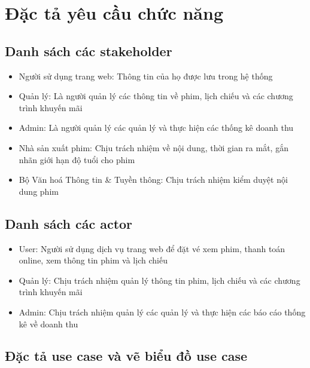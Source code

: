 \documentclass[a4paper, 12pt]{article}
\begin{document}
    \section{Đặc tả yêu cầu chức năng}
    \label{sec:describeFunction}

    \subsection{Danh sách các stakeholder}
    \begin{itemize}
        \item Người sử dụng trang web: Thông tin của họ được lưu trong hệ thống
        \item Quản lý: Là người quản lý các thông tin về phim, lịch chiếu và các chương trình khuyến mãi
        \item Admin: Là người quản lý các quản lý và thực hiện các thống kê doanh thu 
        \item Nhà sản xuất phim: Chịu trách nhiệm về nội dung, thời gian ra mắt, gắn nhãn giới hạn độ tuổi cho phim
        \item Bộ Văn hoá Thông tin \& Tuyền thông: Chịu trách nhiệm kiểm duyệt nội dung phim
    \end{itemize}

    \subsection{Danh sách các actor}
    \begin{itemize}
        \item User: Người sử dụng dịch vụ trang web để đặt vé xem phim, thanh toán online, xem thông tin phim và lịch chiếu
        \item Quản lý: Chịu trách nhiệm quản lý thông tin phim, lịch chiếu và các chương trình khuyến mãi
        \item Admin: Chịu trách nhiệm quản lý các quản lý và thực hiện các báo cáo thống kê về doanh thu 
    \end{itemize}

    \subsection{Đặc tả use case và vẽ biểu đồ use case}
\end{document}
